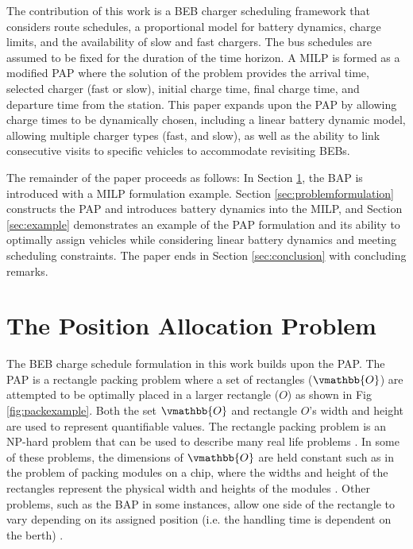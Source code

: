 \documentclass[letterpaper, 10pt, conference]{IEEEtran}
\begin{document}
The contribution of this work is a BEB charger scheduling framework that considers route schedules, a proportional model
for battery dynamics, charge limits, and the availability of slow and fast chargers. The bus schedules are assumed to be
fixed for the duration of the time horizon. A MILP is formed as a modified PAP \cite{Qarebagh2019} where the solution of
the problem provides the arrival time, selected charger (fast or slow), initial charge time, final charge time, and
departure time from the station. This paper expands upon the PAP by allowing charge times to be dynamically chosen,
including a linear battery dynamic model, allowing multiple charger types (fast, and slow), as well as the ability to
link consecutive visits to specific vehicles to accommodate revisiting BEBs.

%

The remainder of the paper proceeds as follows: In Section \ref{sec:positionallocationproblem}, the BAP is introduced
with a MILP formulation example. Section \ref{sec:problemformulation} constructs the PAP and introduces battery dynamics
into the MILP, and Section \ref{sec:example} demonstrates an example of the PAP formulation and its ability to optimally
assign vehicles while considering linear battery dynamics and meeting scheduling constraints. The paper ends in Section
\ref{sec:conclusion} with concluding remarks.

%

\section{The Position Allocation Problem}
\label{sec:positionallocationproblem}
The BEB charge schedule formulation in this work builds upon the PAP. The PAP is a rectangle packing problem where a set
of rectangles ($\vmathbb{O}$) are attempted to be optimally placed in a larger rectangle ($O$) as shown in Fig
\ref{fig:packexample}. Both the set $\vmathbb{O}$ and rectangle $O$'s width and height are used to represent
quantifiable values. The rectangle packing problem is an NP-hard problem that can be used to describe many real life
problems \cite{Bruin2013,Murata1995}. In some of these problems, the dimensions of $\vmathbb{O}$ are held constant such
as in the problem of packing modules on a chip, where the widths and height of the rectangles represent the physical
width and heights of the modules \cite{Murata1995}. Other problems, such as the BAP in some instances, allow one side of
the rectangle to vary depending on its assigned position (i.e. the handling time is dependent on the berth)
\cite{Buhrkal2010}.
\end{document}
